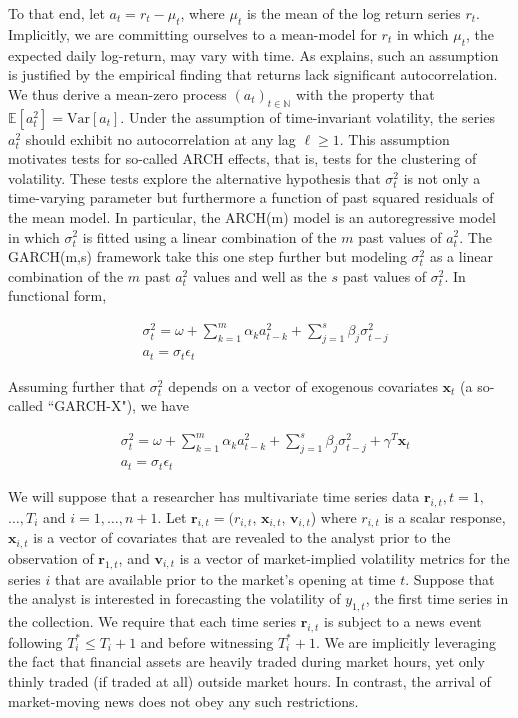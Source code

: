 \documentclass[11pt]{article}
\newcommand{\ret}{\textbf{r}}
\newcommand{\x}{\textbf{x}}
\def\mrm#1{\mathrm{#1}} %
\def\E{\mathbb{E}} %
\theoremstyle{definition}
\begin{document}
To that end, let $a_{t} = r_{t} - \mu_{t}$, where $\mu_{t}$ is the mean of the log return series $r_{t}$.  Implicitly, we are committing ourselves to a mean-model for $r_{t}$ in which $\mu_{t}$, the expected daily log-return, may vary with time.  As \citet{cont2001empirical} explains, such an assumption is justified by the empirical finding that returns lack significant autocorrelation.  We thus derive a mean-zero process $(a_{t})_{t\in\mathbb{N}}$ with the property that $\E[a^{2}_{t}] = \mrm{Var}[a_{t}]$.  Under the assumption of time-invariant volatility, the series $a_{t}^{2}$ should exhibit no autocorrelation at any lag $\ell\geq1$.  This assumption motivates tests for so-called ARCH effects, that is, tests for the clustering of volatility.  These tests explore the alternative hypothesis that $\sigma_{t}^{2}$ is not only a time-varying parameter but furthermore a function of past squared residuals of the mean model.  In particular, the ARCH(m) model is an autoregressive model in which $\sigma_{t}^{2}$ is fitted using a linear combination of the $m$ past values of $a_{t}^{2}$.  The GARCH(m,s) framework take this one step further but modeling $\sigma_{t}^{2}$ as a linear combination of the $m$ past $a_{t}^{2}$ values and well as the $s$ past values of $\sigma_{t}^{2}$.  In functional form,

\begin{align*}
&\sigma_{t}^{2} = \omega + \sum^{m}_{k=1}\alpha_{k}a^{2}_{t-k} + \sum_{j=1}^{s}\beta_{j}\sigma_{t-j}^{2}\\
&a_{t} = \sigma_{t}\epsilon_{t}
\end{align*}

Assuming further that $\sigma^{2}_{t}$ depends on a vector of exogenous covariates $\x_{t}$ (a so-called ``GARCH-X"), we have

\begin{align*}
&\sigma_{t}^{2} = \omega+ \sum^{m}_{k=1}\alpha_{k}a^{2}_{t-k} + \sum_{j=1}^{s}\beta_{j}\sigma_{t-j}^{2} + \gamma^{T}\x_{t}\\
&a_{t} = \sigma_{t}\epsilon_{t}
\end{align*}

We will suppose that a researcher has multivariate time series data $\ret_{i,t}, t = 1,$ $\ldots,  T_i$ and $i = 1, \ldots, n+1$.  Let $\ret_{i,t} = (r_{i,t}$, $\x_{i,t}$, $\textbf{v}_{i,t}$) where $r_{i,t}$ is a scalar response,  $\x_{i,t}$ is a vector of covariates that are revealed to the analyst prior to the observation of $\ret_{1,t}$, and $\textbf{v}_{i,t}$ is a vector of market-implied volatility metrics for the series $i$ that are available prior to the market's opening at time $t$.  Suppose that the analyst is interested in forecasting the volatility of $y_{1,t}$, the first time series in the collection.  We require that each time series $\ret_{i,t}$ is subject to a news event following $T^*_i \leq T_{i} + 1$ and before witnessing $T^*_i+1$.  We are implicitly leveraging the fact that financial assets are heavily traded during market hours, yet only thinly traded (if traded at all) outside market hours.  In contrast, the arrival of market-moving news does not obey any such restrictions.
\end{document}
